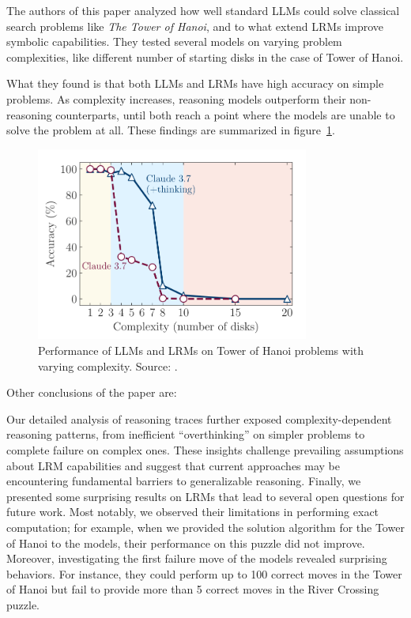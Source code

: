\documentclass[../../main.tex]{subfiles}
\begin{document}
The authors of this paper analyzed how well standard LLMs could solve classical search problems like \emph{The Tower of Hanoi}, and to what extend LRMs improve symbolic capabilities. They tested several models on varying problem complexities, like different number of starting disks in the case of Tower of Hanoi.

What they found is that both LLMs and LRMs have high accuracy on simple problems. As complexity increases, reasoning models outperform their non-reasoning counterparts, until both reach a point where the models are unable to solve the problem at all. These findings are summarized in figure~\ref{fig:illusion-of-thinking}.

\begin{figure}[htbp]
    \centering
    \includegraphics[width=0.8\textwidth]{./chapters/contemporary_research/accuracy_at_complexity.png}
    \caption{Performance of LLMs and LRMs on Tower of Hanoi problems with varying complexity. Source: \textcite{illusion-of-thinking}.}
    \label{fig:illusion-of-thinking}
\end{figure}

Other conclusions of the paper are:

\begin{newcite}
    Our detailed analysis of reasoning traces further exposed complexity-dependent reasoning patterns, from inefficient “overthinking” on simpler problems to complete failure
    on complex ones. These insights challenge prevailing assumptions about LRM capabilities and
    suggest that current approaches may be encountering fundamental barriers to generalizable reasoning.
    Finally, we presented some surprising results on LRMs that lead to several open questions for future
    work. Most notably, we observed their limitations in performing exact computation; for example,
    when we provided the solution algorithm for the Tower of Hanoi to the models, their performance
    on this puzzle did not improve. Moreover, investigating the first failure move of the models revealed
    surprising behaviors. For instance, they could perform up to 100 correct moves in the Tower of
    Hanoi but fail to provide more than 5 correct moves in the River Crossing puzzle.
\end{newcite}
\end{document}
